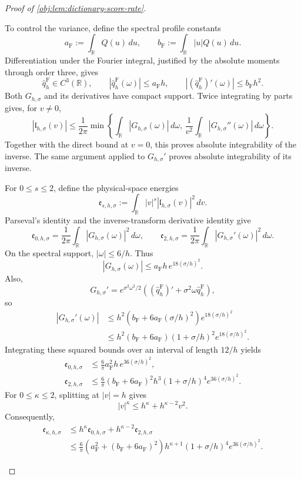\begin{proof}[Proof of \cref{obj:lem:dictionary-score-rate}]
\begin{enumerate}
To control the variance, define the spectral profile constants
\[
a_{\mathrm F}:=\int_{\mathbb R}Q(u)\,du,
\qquad
b_{\mathrm F}:=\int_{\mathbb R}|u|Q(u)\,du.
\]
Differentiation under the Fourier integral, justified by the absolute moments through order three, gives
\[
\widehat q_h^{\mathrm F}\in C^3(\mathbb R),
\qquad
|\widehat q_h^{\mathrm F}(\omega)|\le a_{\mathrm F}h,
\qquad
|(\widehat q_h^{\mathrm F})'(\omega)|\le b_{\mathrm F}h^2.
\]
Both \(G_{h,\sigma}\) and its derivatives have compact support. Twice integrating by parts gives, for \(v\ne0\),
\[
|\mathfrak l_{h,\sigma}(v)|
\le\frac1{2\pi}
\min\left\{
\int_{\mathbb R}|G_{h,\sigma}(\omega)|\,d\omega,\,
\frac1{v^2}\int_{\mathbb R}|G_{h,\sigma}''(\omega)|\,d\omega
\right\}.
\]
Together with the direct bound at \(v=0\), this proves absolute integrability of the inverse. The same argument applied to \(G_{h,\sigma}'\) proves absolute integrability of its inverse.

For \(0\le s\le2\), define the physical-space energies
\[
\mathfrak e_{s,h,\sigma}
:=\int_{\mathbb R}|v|^s|\mathfrak l_{h,\sigma}(v)|^2\,dv.
\]
Parseval's identity and the inverse-transform derivative identity give
\[
\mathfrak e_{0,h,\sigma}
=\frac1{2\pi}\int_{\mathbb R}|G_{h,\sigma}(\omega)|^2\,d\omega,
\qquad
\mathfrak e_{2,h,\sigma}
=\frac1{2\pi}\int_{\mathbb R}|G_{h,\sigma}'(\omega)|^2\,d\omega.
\]
On the spectral support, \(|\omega|\le6/h\). Thus
\[
|G_{h,\sigma}(\omega)|
\le a_{\mathrm F}h\,e^{18(\sigma/h)^2}.
\]
Also,
\[
G_{h,\sigma}'
=e^{\sigma^2\omega^2/2}
\left((\widehat q_h^{\mathrm F})'
      +\sigma^2\omega\widehat q_h^{\mathrm F}\right),
\]
so
\[
\begin{aligned}
|G_{h,\sigma}'(\omega)|
&\le h^2\left(b_{\mathrm F}
             +6a_{\mathrm F}(\sigma/h)^2\right)e^{18(\sigma/h)^2}\\
&\le h^2(b_{\mathrm F}+6a_{\mathrm F})
       (1+\sigma/h)^2e^{18(\sigma/h)^2}.
\end{aligned}
\]
Integrating these squared bounds over an interval of length \(12/h\) yields
\[
\begin{aligned}
\mathfrak e_{0,h,\sigma}
&\le\frac6\pi a_{\mathrm F}^2h\,e^{36(\sigma/h)^2},\\
\mathfrak e_{2,h,\sigma}
&\le\frac6\pi(b_{\mathrm F}+6a_{\mathrm F})^2
h^3(1+\sigma/h)^4e^{36(\sigma/h)^2}.
\end{aligned}
\]
For \(0\le\kappa\le2\), splitting at \(|v|=h\) gives
\[
|v|^\kappa\le h^\kappa+h^{\kappa-2}v^2.
\]
Consequently,
\[
\begin{aligned}
\mathfrak e_{\kappa,h,\sigma}
&\le h^\kappa\mathfrak e_{0,h,\sigma}
    +h^{\kappa-2}\mathfrak e_{2,h,\sigma}\\
&\le\frac6\pi
\left(a_{\mathrm F}^2+(b_{\mathrm F}+6a_{\mathrm F})^2\right)
h^{\kappa+1}(1+\sigma/h)^4e^{36(\sigma/h)^2}.
\end{aligned}
\]


\end{enumerate}
\end{proof}
